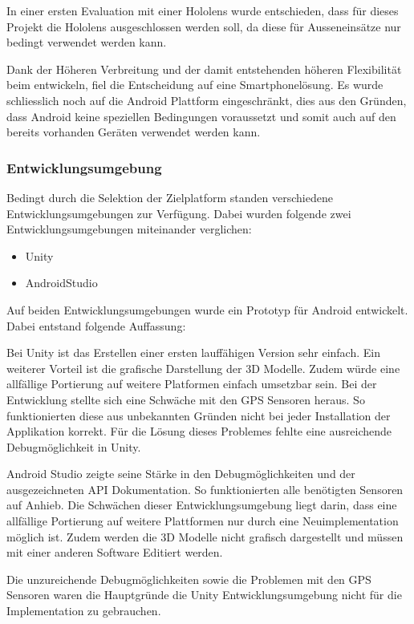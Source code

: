 \documentclass[a4paper]{scrreprt}
\begin{document}
In einer ersten Evaluation mit einer Hololens wurde entschieden, dass für dieses Projekt die Hololens ausgeschlossen werden soll, da diese für Ausseneinsätze nur bedingt verwendet werden kann.

Dank der Höheren Verbreitung und der damit entstehenden höheren Flexibilität beim entwickeln, fiel die Entscheidung auf eine Smartphonelösung. Es wurde schliesslich noch auf die Android Plattform eingeschränkt, dies aus den Gründen, dass Android keine speziellen Bedingungen voraussetzt und somit auch auf den bereits vorhanden Geräten verwendet werden kann. 

\subsubsection{Entwicklungsumgebung}
\label{ssec:EvalPlattform}
Bedingt durch die Selektion der Zielplatform standen verschiedene Entwicklungsumgebungen zur Verfügung. Dabei wurden folgende zwei Entwicklungsumgebungen miteinander verglichen:
\begin{itemize}
\item Unity
\item AndroidStudio
\end{itemize}

Auf beiden Entwicklungsumgebungen wurde ein Prototyp für Android entwickelt. Dabei entstand folgende Auffassung:

Bei Unity ist das Erstellen einer ersten lauffähigen Version sehr einfach. Ein weiterer Vorteil ist die grafische Darstellung der 3D Modelle. Zudem würde eine allfällige Portierung auf weitere Platformen einfach umsetzbar sein. Bei der Entwicklung stellte sich eine Schwäche mit den GPS Sensoren heraus. So funktionierten diese aus unbekannten Gründen nicht bei jeder Installation der Applikation korrekt. Für die Lösung dieses Problemes fehlte eine ausreichende Debugmöglichkeit in Unity.

Android Studio zeigte seine Stärke in den Debugmöglichkeiten und der ausgezeichneten API Dokumentation. So funktionierten alle benötigten Sensoren auf Anhieb. Die Schwächen dieser Entwicklungsumgebung liegt darin, dass eine allfällige Portierung auf weitere Plattformen nur durch eine Neuimplementation möglich ist. Zudem werden die 3D Modelle nicht grafisch dargestellt und müssen mit einer anderen Software Editiert werden.

Die unzureichende Debugmöglichkeiten sowie die Problemen mit den GPS Sensoren waren die Hauptgründe die Unity Entwicklungsumgebung nicht für die Implementation zu gebrauchen.
\end{document}
